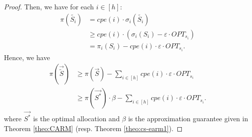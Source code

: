 {{\begin{proof}
Then, we have for each $i \in [h]$:
\begin{align*}
\pi(\tilde{S_i}) &=  cpe(i) \cdot \sigma_i(\tilde{S_i}) \\
&\ge cpe(i) \cdot (\sigma_i(S_i) -  \varepsilon \cdot OPT_{{s}_i})  \\
&= \pi_i(S_i) - cpe(i) \cdot  \varepsilon \cdot OPT_{{s}_i}.
\end{align*}
Hence, we have
\begin{align*}
\pi(\vec{\tilde{S}}) &\ge \pi(\vec{S}) - \sum_{i \in [h]} cpe(i) \cdot  \varepsilon \cdot OPT_{{s}_i} \\
&\ge \pi(\vec{S^*}) \cdot \beta  -  \sum_{i \in [h]} cpe(i) \cdot  \varepsilon \cdot OPT_{{s}_i}.
\end{align*}
where $\vec{S^*}$ is the optimal allocation and $\beta$ is the approximation guarantee given in Theorem \ref{theo:CARM} (resp. Theorem \ref{theo:cs-earm1}).
\end{proof}}
}

